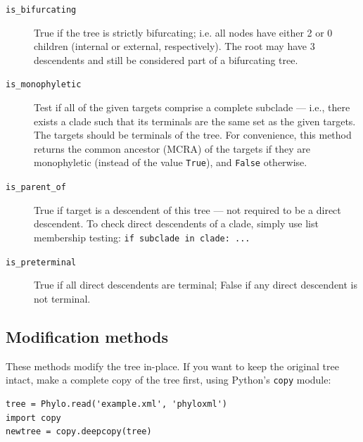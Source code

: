 \documentclass{report}
\begin{document}
\begin{description}
  \item[\texttt{is\_bifurcating}]
    True if the tree is strictly bifurcating; i.e. all nodes have either 2 or 0 children
    (internal or external, respectively). The root may have 3 descendents and still be
    considered part of a bifurcating tree.

  \item[\texttt{is\_monophyletic}]
    Test if all of the given targets comprise a complete subclade --- i.e., there
    exists a clade such that its terminals are the same set as the given targets. The targets
    should be terminals of the tree. For convenience, this method returns the common ancestor
    (MCRA) of the targets if they are monophyletic (instead of the value \verb|True|), and
    \verb|False| otherwise.

  \item[\texttt{is\_parent\_of}] True if target is a descendent of this tree --- not required
    to be a direct descendent. To check direct descendents of a clade, simply use list
    membership testing: \verb|if subclade in clade: ...|

  \item[\texttt{is\_preterminal}] True if all direct descendents are terminal; False if any
    direct descendent is not terminal.

\end{description}


\subsection{Modification methods}

These methods modify the tree in-place. If you want to keep the original tree intact, make a
complete copy of the tree first, using Python's \texttt{copy} module:

\begin{verbatim}
tree = Phylo.read('example.xml', 'phyloxml')
import copy
newtree = copy.deepcopy(tree)
\end{verbatim}
\end{document}
